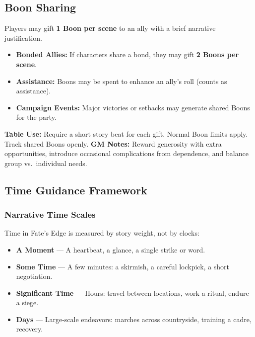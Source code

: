 \subsection{Boon Sharing}

Players may gift \textbf{1 Boon per scene} to an ally with a brief narrative justification.  
\begin{itemize}
  \item \textbf{Bonded Allies:} If characters share a bond, they may gift \textbf{2 Boons per scene}.  
  \item \textbf{Assistance:} Boons may be spent to enhance an ally’s roll (counts as assistance).  
  \item \textbf{Campaign Events:} Major victories or setbacks may generate shared Boons for the party.  
\end{itemize}

\textbf{Table Use:} Require a short story beat for each gift. Normal Boon limits apply. Track shared Boons openly.  
\textbf{GM Notes:} Reward generosity with extra opportunities, introduce occasional complications from dependence, and balance group vs.\ individual needs.

\subsection{Time Guidance Framework}

\subsubsection{Narrative Time Scales}
Time in Fate's Edge is measured by story weight, not by clocks:
\begin{itemize}
  \item \textbf{A Moment} — A heartbeat, a glance, a single strike or word.
  \item \textbf{Some Time} — A few minutes: a skirmish, a careful lockpick, a short negotiation.
  \item \textbf{Significant Time} — Hours: travel between locations, work a ritual, endure a siege.
  \item \textbf{Days} — Large-scale endeavors: marches across countryside, training a cadre, recovery.
\end{itemize}


